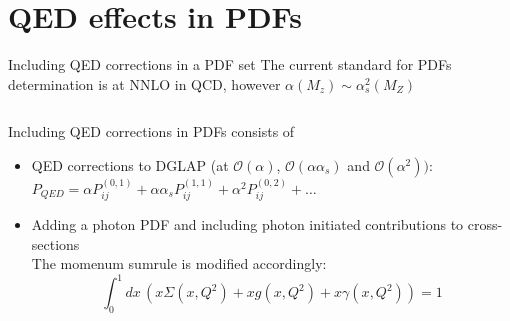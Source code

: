 \documentclass[aspectratio=169, 8pt,t]{beamer}
\begin{document}

\section{QED effects in PDFs}

\begin{frame}{Including QED corrections in a PDF set}
  The current standard for PDFs determination is at NNLO in QCD, however  $\alpha(M_z) \sim \alpha_s^2(M_Z)$

  \begin{columns}
    \begin{column}{0.49\textwidth}

      \vspace*{1em}
      Including QED corrections in PDFs consists of \vspace*{0.5em}
      \begin{itemize}
        \item QED corrections to DGLAP (at $\mathcal{O}(\alpha)$, $\mathcal{O}(\alpha \alpha_s)$ and $\mathcal{O}(\alpha^2))$: \\ 
        $P_{QED}=\alpha P_{ij}^{(0,1)}+\alpha \alpha_s P_{ij}^{(1,1)}+\alpha^2 P_{ij}^{(0,2)}+\ldots$
        \vspace*{0.5em}
        \item Adding a photon PDF and including photon initiated contributions to cross-sections \\
        The momenum sumrule is modified accordingly:   
        \begin{equation*}
          \int_0^1 dx\, \left(  x\Sigma(x,Q^2) + xg(x,Q^2) + x\gamma(x,Q^2) \right) =1
        \end{equation*}
      \end{itemize}
    \end{column}


\end{columns}
\end{frame}
\end{document}
